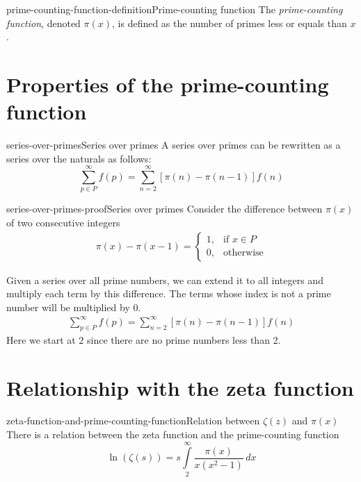 \documentclass[preview]{standalone}
\begin{document}
\genpage

\begin{snippetdefinition}{prime-counting-function-definition}{Prime-counting function}
    The \textit{prime-counting function}, denoted \(\pi(x)\),
    is defined as the number of primes less or equals than \(x\).
\end{snippetdefinition}

\section{Properties of the prime-counting function}

\begin{snippetproposition}{series-over-primes}{Series over primes}
    A series over primes can be rewritten as a series over the naturals as follows:
    \[
        \sum_{p\in P}^{\infty}f(p)=\sum_{n=2}^{\infty}\left[\pi(n)-\pi(n-1)\right]f(n)
    \]
\end{snippetproposition}

\begin{snippetproof}{series-over-primes-proof}{Series over primes}
    Consider the difference between \(\pi(x)\) of two consecutive integers
    \begin{align*}
        \pi (x)-\pi (x-1)= 
        \begin{cases}
            1,& \text{if } x\in P
            \\
            0,& \text{otherwise}
        \end{cases}
    \end{align*}

    Given a series over all prime numbers, we can extend it to all integers and multiply each term by this difference.
    The terms whose index is not a prime number will be multiplied by 0.
    \begin{align*}
        \sum_{p\in P}^{\infty}f(p)=\sum_{n=2}^{\infty}\left[\pi(n)-\pi(n-1)\right]f(n)
    \end{align*}
    Here we start at 2 since there are no prime numbers less than 2.
\end{snippetproof}

\section{Relationship with the zeta function}

\begin{snippettheorem}{zeta-function-and-prime-counting-function}{Relation between \(\zeta(z)\) and \(\pi(x)\)}
    There is a relation between the zeta function and the prime-counting function
    \[
        \ln\left(\zeta(s)\right)=
        s\int\limits_2^\infty
        \frac{\pi(x)}{x(x^2-1)}\,dx
    \]
\end{snippettheorem}
\end{document}
